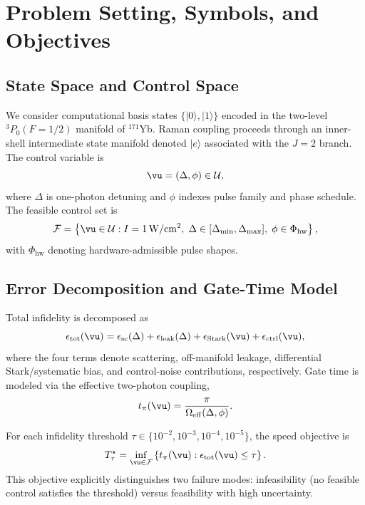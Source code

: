 \documentclass{article} %
\begin{document}
\section{Problem Setting, Symbols, and Objectives}
\label{sec:setting}
\subsection{State Space and Control Space}
We consider computational basis states $\{|0\rangle,|1\rangle\}$ encoded in the two-level $^3P_0(F=1/2)$ manifold of $^{171}$Yb. Raman coupling proceeds through an inner-shell intermediate state manifold denoted $|e\rangle$ associated with the $J=2$ branch. The control variable is
\begin{equation}
\vu = (\Delta,\phi) \in \mathcal{U},
\label{eq:control}
\end{equation}
where $\Delta$ is one-photon detuning and $\phi$ indexes pulse family and phase schedule. The feasible control set is
\begin{equation}
\mathcal{F}=\left\{\vu\in\mathcal{U}: I=1\,\mathrm{W/cm^2},\; \Delta\in[\Delta_{\min},\Delta_{\max}],\; \phi\in\Phi_{\mathrm{hw}}\right\},
\label{eq:feasible}
\end{equation}
with $\Phi_{\mathrm{hw}}$ denoting hardware-admissible pulse shapes.

\subsection{Error Decomposition and Gate-Time Model}
Total infidelity is decomposed as
\begin{equation}
\epsilon_{\mathrm{tot}}(\vu)=\epsilon_{\mathrm{sc}}(\Delta)+\epsilon_{\mathrm{leak}}(\Delta)+\epsilon_{\mathrm{Stark}}(\vu)+\epsilon_{\mathrm{ctrl}}(\vu),
\label{eq:eps_total}
\end{equation}
where the four terms denote scattering, off-manifold leakage, differential Stark/systematic bias, and control-noise contributions, respectively. Gate time is modeled via the effective two-photon coupling,
\begin{equation}
t_{\pi}(\vu)=\frac{\pi}{\Omega_{\mathrm{eff}}(\Delta,\phi)}.
\label{eq:gate_time}
\end{equation}

For each infidelity threshold $\tau\in\{10^{-2},10^{-3},10^{-4},10^{-5}\}$, the speed objective is
\begin{equation}
T_{\tau}^{\star}=\inf_{\vu\in\mathcal{F}}\left\{t_{\pi}(\vu):\epsilon_{\mathrm{tot}}(\vu)\le\tau\right\}.
\label{eq:threshold_objective}
\end{equation}
This objective explicitly distinguishes two failure modes: infeasibility (no feasible control satisfies the threshold) versus feasibility with high uncertainty.
\end{document}
